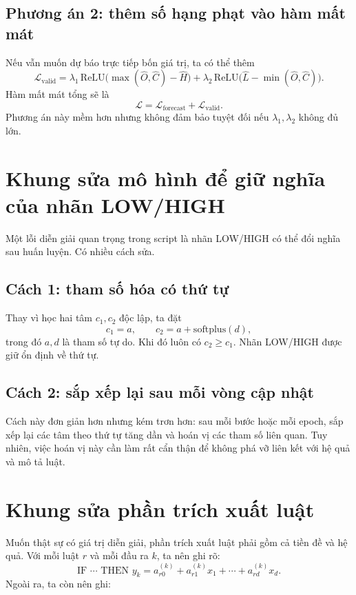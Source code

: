 \subsection{Phương án 2: thêm số hạng phạt vào hàm mất mát}

Nếu vẫn muốn dự báo trực tiếp bốn giá trị, ta có thể thêm
\[
\mathcal{L}_{\mathrm{valid}} =
\lambda_1 \,\mathrm{ReLU}\big(\max(\hat{O},\hat{C})-\hat{H}\big)
+
\lambda_2 \,\mathrm{ReLU}\big(\hat{L}-\min(\hat{O},\hat{C})\big).
\]
Hàm mất mát tổng sẽ là
\[
\mathcal{L}=\mathcal{L}_{\mathrm{forecast}}+\mathcal{L}_{\mathrm{valid}}.
\]
Phương án này mềm hơn nhưng không đảm bảo tuyệt đối nếu \(\lambda_1,\lambda_2\) không đủ lớn.

\section{Khung sửa mô hình để giữ nghĩa của nhãn LOW/HIGH}

Một lỗi diễn giải quan trọng trong script là nhãn LOW/HIGH có thể đổi nghĩa sau huấn luyện. Có nhiều cách sửa.

\subsection{Cách 1: tham số hóa có thứ tự}

Thay vì học hai tâm \(c_1,c_2\) độc lập, ta đặt
\[
c_1 = a,\qquad c_2 = a + \mathrm{softplus}(d),
\]
trong đó \(a,d\) là tham số tự do. Khi đó luôn có \(c_2\ge c_1\). Nhãn LOW/HIGH được giữ ổn định về thứ tự.

\subsection{Cách 2: sắp xếp lại sau mỗi vòng cập nhật}

Cách này đơn giản hơn nhưng kém trơn hơn: sau mỗi bước hoặc mỗi epoch, sắp xếp lại các tâm theo thứ tự tăng dần và hoán vị các tham số liên quan. Tuy nhiên, việc hoán vị này cần làm rất cẩn thận để không phá vỡ liên kết với hệ quả và mô tả luật.

\section{Khung sửa phần trích xuất luật}

Muốn thật sự có giá trị diễn giải, phần trích xuất luật phải gồm cả tiền đề và hệ quả. Với mỗi luật \(r\) và mỗi đầu ra \(k\), ta nên ghi rõ:
\[
\text{IF } \cdots \text{ THEN } y_k = a_{r0}^{(k)} + a_{r1}^{(k)}x_1 + \cdots + a_{rd}^{(k)}x_d.
\]
Ngoài ra, ta còn nên ghi:

